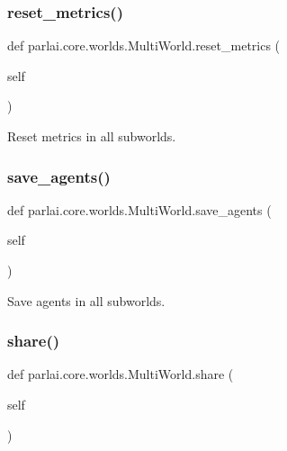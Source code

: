 \subsubsection{\texorpdfstring{reset\+\_\+metrics()}{reset\_metrics()}}
{\footnotesize\ttfamily def parlai.\+core.\+worlds.\+Multi\+World.\+reset\+\_\+metrics (\begin{DoxyParamCaption}\item[{}]{self }\end{DoxyParamCaption})}

\begin{DoxyVerb}Reset metrics in all subworlds.
\end{DoxyVerb}
 \mbox{\label{classparlai_1_1core_1_1worlds_1_1MultiWorld_a4d72a950f8aae3d248a9694908f0fc85}} 
\subsubsection{\texorpdfstring{save\+\_\+agents()}{save\_agents()}}
{\footnotesize\ttfamily def parlai.\+core.\+worlds.\+Multi\+World.\+save\+\_\+agents (\begin{DoxyParamCaption}\item[{}]{self }\end{DoxyParamCaption})}

\begin{DoxyVerb}Save agents in all subworlds.
\end{DoxyVerb}
 \mbox{\label{classparlai_1_1core_1_1worlds_1_1MultiWorld_ae780a8cfd7c6b675727cca24b8321015}} 
\subsubsection{\texorpdfstring{share()}{share()}}
{\footnotesize\ttfamily def parlai.\+core.\+worlds.\+Multi\+World.\+share (\begin{DoxyParamCaption}\item[{}]{self }\end{DoxyParamCaption})}

